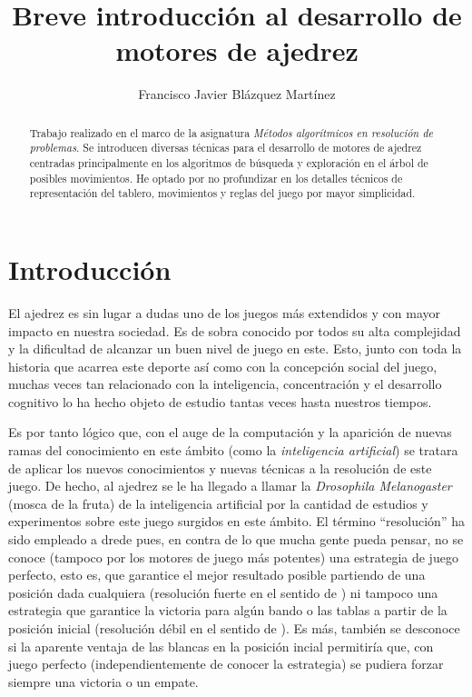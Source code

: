 \documentclass[letterpaper,12pt]{article}
\begin{document}
\title{\bf{Breve introducción al desarrollo de motores de ajedrez}}
\author{Francisco Javier Blázquez Martínez}
\date{}
\maketitle

\begin{abstract}

Trabajo realizado en el marco de la asignatura \textit{Métodos algorítmicos 
en resolución de problemas}. Se introducen diversas técnicas para el desarrollo
de motores de ajedrez centradas principalmente en los algoritmos de búsqueda
y exploración en el árbol de posibles movimientos. He optado por no profundizar
en los detalles técnicos de representación del tablero, movimientos y reglas del 
juego por mayor simplicidad.

\end{abstract}

\section{Introducción}

El ajedrez es sin lugar a dudas uno de los juegos más extendidos y con mayor 
impacto en nuestra sociedad. Es de sobra conocido por todos su alta complejidad 
y la dificultad de alcanzar un buen nivel de juego en este. Esto, junto con toda
la historia que acarrea este deporte así como con la concepción social del juego,
muchas veces tan relacionado con la inteligencia, concentración y el desarrollo 
cognitivo lo ha hecho objeto de estudio tantas veces hasta nuestros tiempos. 

Es por tanto lógico que, con el auge de la computación y la aparición de nuevas
ramas del conocimiento en este ámbito (como la \textit{inteligencia artificial})
se tratara de aplicar los nuevos conocimientos y nuevas técnicas a la resolución
de este juego. De hecho, al ajedrez se le ha llegado a llamar la \textit{Drosophila
Melanogaster} (mosca de la fruta) de la inteligencia artificial por la cantidad de 
estudios y experimentos sobre este juego surgidos en este ámbito.
El término ``resolución'' ha sido empleado a drede pues, en contra
de lo que mucha gente pueda pensar, no se conoce (tampoco por los motores de juego
más potentes) una estrategia de juego perfecto, esto es, que garantice el mejor
resultado posible partiendo de una posición dada cualquiera (resolución fuerte 
en el sentido de \cite{Checkers is solved}) ni tampoco una estrategia que garantice
la victoria para algún bando o las tablas a partir de la posición inicial (resolución
débil en el sentido de \cite{Checkers is solved}). Es más, también se desconoce 
si la aparente ventaja de las blancas en la posición incial permitiría que, con
juego perfecto (independientemente de conocer la estrategia) se pudiera forzar 
siempre una victoria o un empate. 
\end{document}
